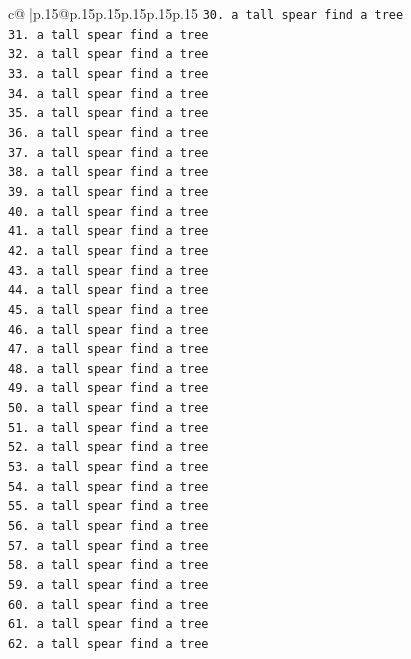 \documentclass{article}
\begin{document}
{\begin{supertabular}{c@{$\;$}|p{.15\linewidth}@{}p{.15\linewidth}p{.15\linewidth}p{.15\linewidth}p{.15\linewidth}p{.15\linewidth}}
{{{\texttt{30. a tall spear find a tree} \\
\texttt{31. a tall spear find a tree} \\
\texttt{32. a tall spear find a tree} \\
\texttt{33. a tall spear find a tree} \\
\texttt{34. a tall spear find a tree} \\
\texttt{35. a tall spear find a tree} \\
\texttt{36. a tall spear find a tree} \\
\texttt{37. a tall spear find a tree} \\
\texttt{38. a tall spear find a tree} \\
\texttt{39. a tall spear find a tree} \\
\texttt{40. a tall spear find a tree} \\
\texttt{41. a tall spear find a tree} \\
\texttt{42. a tall spear find a tree} \\
\texttt{43. a tall spear find a tree} \\
\texttt{44. a tall spear find a tree} \\
\texttt{45. a tall spear find a tree} \\
\texttt{46. a tall spear find a tree} \\
\texttt{47. a tall spear find a tree} \\
\texttt{48. a tall spear find a tree} \\
\texttt{49. a tall spear find a tree} \\
\texttt{50. a tall spear find a tree} \\
\texttt{51. a tall spear find a tree} \\
\texttt{52. a tall spear find a tree} \\
\texttt{53. a tall spear find a tree} \\
\texttt{54. a tall spear find a tree} \\
\texttt{55. a tall spear find a tree} \\
\texttt{56. a tall spear find a tree} \\
\texttt{57. a tall spear find a tree} \\
\texttt{58. a tall spear find a tree} \\
\texttt{59. a tall spear find a tree} \\
\texttt{60. a tall spear find a tree} \\
\texttt{61. a tall spear find a tree} \\
\texttt{62. a tall spear find a tree} \\
}}}
\end{supertabular}}
\end{document}
